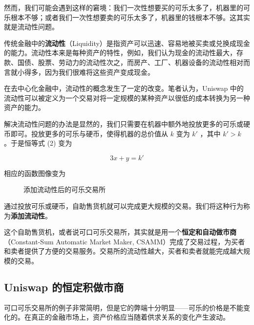 \documentclass[12pt, a4paper, oneside]{ctexart}
\begin{document}
然而，我们可能会遇到这样的窘境：我们一次性想要买的可乐太多了，机器里的可乐根本不够；或者我们一次性想要卖的可乐太多了，机器里的钱根本不够。这其实就是流动性问题。

传统金融中的\textbf{流动性}（Liquidity）是指资产可以迅速、容易地被买卖或兑换成现金的能力。流动性本来是每种资产的特性，例如，我们认为现金的流动性最大，存款、国债、股票、劳动力的流动性次之，而房产、工厂、机器设备的流动性相对而言就小得多，因为我们很难将这些资产变成现金。

在去中心化金融中，流动性的概念发生了一定的改变。笔者认为，Uniswap 中的流动性可以被定义为一个交易对将一定规模的某种资产以很低的成本转换为另一种资产的能力。

解决流动性问题的办法是显然的，我们只需要在机器中额外地投放更多的可乐或硬币即可。投放更多的可乐与硬币，使得机器的总价值从 $k$ 变为 $k'$ ，其中 $k' > k$ 。于是恒等式 (2) 变为

\begin{equation}
    3x + y = k'
\end{equation}

相应的函数图像变为

\begin{figure}[htbp]
    \centering
    \caption{添加流动性后的可乐交易所}
\end{figure}

通过投放可乐或硬币，自助售货机就可以完成更大规模的交易。我们将这种行为称为\textbf{添加流动性}。

这个自助售货机，或者说可口可乐交易所，其实就是用一个\textbf{恒定和自动做市商}（Constant-Sum Automatic Market Maker, CSAMM）完成了交易过程，为买者和卖者提供了方便的交易服务。交易所的流动性越大，买者和卖者就能完成越大规模的交易。

\subsection{Uniswap 的恒定积做市商}

可口可乐交易所的例子非常简明，但是它的弊端十分明显——可乐的价格是不能变化的。在真正的金融市场上，资产价格应当随着供求关系的变化产生波动。
\end{document}
